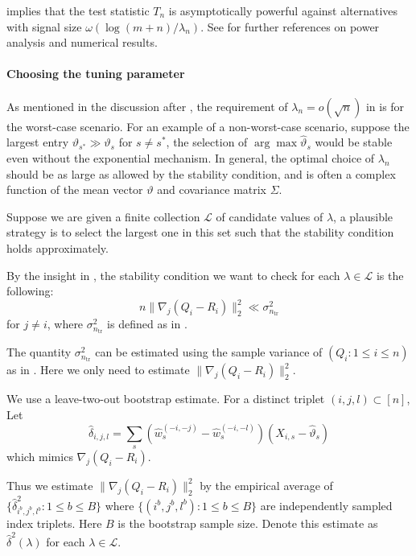 \documentclass[11pt]{article}
\theoremstyle{plain}
\newcommand{\tr}{{\mathrm{tr}}}
\begin{document}
     implies that the test statistic $T_n$ is asymptotically powerful against alternatives with signal size $\omega(\log(m+n)/\lambda_n)$.
    See  for further references on power analysis and numerical results.

\paragraph{Choosing the tuning parameter}
As mentioned in the discussion after , 
the requirement of $\lambda_n=o(\sqrt{n})$ in  is for the worst-case scenario.
For an example of a non-worst-case scenario, suppose the largest entry $\vartheta_{s^*}\gg \vartheta_s$ for $s\neq s^*$, the selection of $\arg\max\hat\vartheta_s$ would be stable even without the exponential mechanism.  
In general, the optimal choice of $\lambda_n$ should be as large as allowed by the stability condition, and is often a complex function of the mean vector $\vartheta$ and covariance matrix $\Sigma$.  

Suppose we are given a finite collection $\mathcal L$ of candidate values of $\lambda$, a plausible strategy is to select the largest one in this set such that the stability condition holds approximately.

By the insight in ,  the stability condition we want to check for each $\lambda\in\mathcal L$ is the following:
\begin{equation}
    \label{eq:5.3-approx-stab-cond}
    n\|\nabla_j (Q_i-R_i)\|_2^2\ll \sigma_{n_\tr}^2
\end{equation}
for $j\neq i$, where $\sigma_{n_\tr}^2$ is defined as in .

The quantity $\sigma_{n_\tr}^2$ can be estimated using the sample variance of $(Q_i:1\le i\le n)$ as in .  Here we only need to estimate $\|\nabla_j(Q_i-R_i)\|_2^2$.

We use a leave-two-out bootstrap estimate.  For a distinct triplet $(i,j,l)\subset[n]$, 
Let $$\hat\delta_{i,j,l}=\sum_s(\hat w_s^{(-i,-j)}-\hat w_s^{(-i,-l)})(X_{i,s}-\hat\vartheta_s)$$
which mimics $\nabla_j(Q_i-R_i)$.

Thus we estimate $\|\nabla_j(Q_i-R_i)\|_2^2$ by the empirical average of  
$\{\hat\delta_{i^b,j^b,l^b}^2:1\le b\le B\}$
where $\{(i^b,j^b,l^b):1\le b\le B\}$ are independently sampled index triplets.  Here $B$ is the bootstrap sample size. Denote this estimate as $\hat\delta^2(\lambda)$ for each $\lambda\in\mathcal L$.
\end{document}
